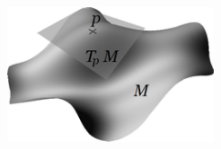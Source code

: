 \begin{titlepage}
    \begin{addmargin}[-1cm]{-3cm}
    \begin{center}
        \large  

        \hfill

        \vfill

        \begingroup
            \color{Maroon}\spacedallcaps{\myTitle} \\ \bigskip
        \endgroup

        \spacedlowsmallcaps{\myName} \\

        \vfill

        \includegraphics[width=6cm]{gfx/portada} \\ \medskip

        \mySubtitle \\ \medskip   
        \myDepartment \\                            
        \myUni \\ \bigskip


        \vfill                      

    \end{center}  
  \end{addmargin}       
\end{titlepage}   
